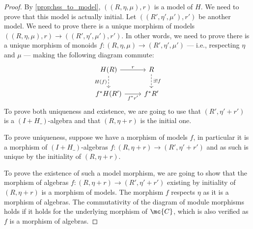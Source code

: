 \initialitytheorem*
\begin{proof}
  By \cref{prop:hss_to_model}, $((R,η, μ), r)$ is a model of $H$.
  We need to prove that this model is actually initial.
  Let $((R',η', μ'), r')$ be another model.
  We need to prove there is a unique morphism of models $((R,η, μ),
  r) → ((R',η',μ'),r')$.
  In other words, we need to prove there is a unique morphism of monoids $f
  : (R,η,μ) → (R',η',μ')$ --- i.e., respecting $η$ and $μ$
  --- making the following diagram commute:
  \[
    \begin{tikzcd}
      H(R) \ar[r, "r"] \ar[d, swap, dashed, "H(f)"]
        & R \ar[d, dashed, "\exists ! f"] \\
      f^*H(R') \ar[r, swap, "f^*r'"] & f^*R'
    \end{tikzcd}
  \]
  To prove both uniqueness and existence, we are going to use that $(R',
  η' + r')$ is a $(I + H\_)$-algebra and that $(R, η + r)$ is the
  initial one. \medskip

  To prove uniqueness, suppose we have a morphism of models $f$, in
  particular it is a morphism of $(I + H\_)$-algebras $f : (R, η + r) →
  (R', η' + r')$ and as such is unique by the initiality of $(R, η
  + r)$. \medskip

  To prove the existence of such a model morphism, we are going to show that
  the morphism of algebras $f : (R, η + r) → (R', η' + r')$
  existing by initiality of $(R, η + r)$ is a morphism of models.
  The morphism $f$ respects $η$ as it is a morphism of algebras.
  The commutativity of the diagram of module morphisms holds if it holds for
  the underlying morphism of $\mc{C}$, which is also verified as $f$ is a
  morphism of algebras.


\end{proof}
